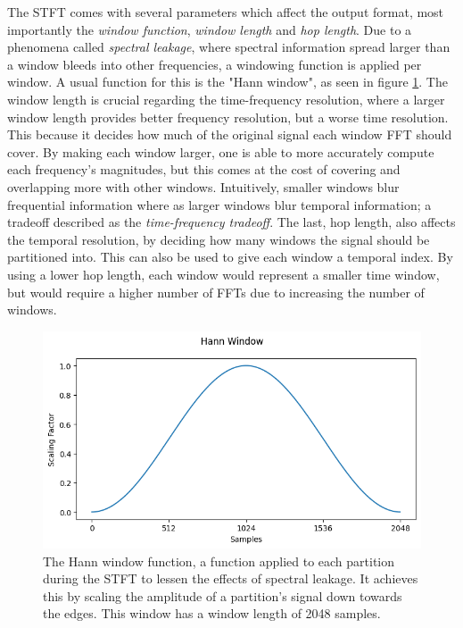 The \gls{STFT} comes with several parameters which affect the output format, most importantly the \textit{window function}, \textit{window length} and \textit{hop length}. Due to a phenomena called \textit{spectral leakage}, where spectral information spread larger than a window bleeds into other frequencies, a windowing function is applied per window. A usual function for this is the "Hann window", as seen in figure \ref{HannWindowFigure}. The window length is crucial regarding the time-frequency resolution, where a larger window length provides better frequency resolution, but a worse time resolution. This because it decides how much of the original signal each window \gls{FFT} should cover. By making each window larger, one is able to more accurately compute each frequency's magnitudes, but this comes at the cost of covering and overlapping more with other windows. Intuitively, smaller windows blur frequential information where as larger windows blur temporal information; a tradeoff described as the \textit{time-frequency tradeoff}. The last, hop length, also affects the temporal resolution, by deciding how many windows the signal should be partitioned into. This can also be used to give each window a temporal index. By using a lower hop length, each window would represent a smaller time window, but would require a higher number of \glspl{FFT} due to increasing the number of windows.

\begin{figure}[H]
    \centering
    \includegraphics[scale=0.8]{figures/hann}
    \caption{The Hann window function, a function applied to each partition during the \gls{STFT} to lessen the effects of spectral leakage. It achieves this by scaling the amplitude of a partition's signal down towards the edges. This window has a window length of 2048 samples.}
    \label{HannWindowFigure}
\end{figure}

